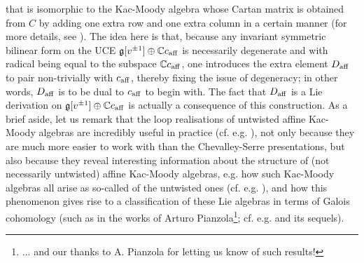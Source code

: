         that is isomorphic to the Kac-Moody algebra whose Cartan matrix is obtained from $C$ by adding one extra row and one extra column in a certain manner (for more details, see \cite[Chapter 7]{kac_infinite_dimensional_lie_algebras}). The idea here is that, because any invariant symmetric bilinear form on the UCE $\mathfrak{g}[v^{\pm 1}] \oplus \mathbb{C} c_{\mathrm{aff}}$ is necessarily degenerate and with radical being equal to the subspace $\mathbb{C} c_{\mathrm{aff}}$, one introduces the extra element $D_{\mathrm{aff}}$ to pair non-trivially with $c_{\mathrm{aff}}$, thereby fixing the issue of degeneracy; in other words, $D_{\mathrm{aff}}$ is to be dual to $c_{\mathrm{aff}}$ to begin with. The fact that $D_{\mathrm{aff}}$ is a Lie derivation on $\mathfrak{g}[v^{\pm 1}] \oplus \mathbb{C} c_{\mathrm{aff}}$ is actually a consequence of this construction. As a brief aside, let us remark that the loop realisations of untwisted affine Kac-Moody algebras are incredibly useful in practice (cf. e.g. \cite[Chapters 9 and 10]{kac_infinite_dimensional_lie_algebras}), not only because they are much more easier to work with than the Chevalley-Serre presentations, but also because they reveal interesting information about the structure of (not necessarily untwisted) affine Kac-Moody algebras, e.g. how such Kac-Moody algebras all arise as so-called  of the untwisted ones (cf. e.g. \cite[Chapter 8]{kac_infinite_dimensional_lie_algebras}), and how this phenomenon gives rise to a classification of these Lie algebras in terms of Galois cohomology (such as in the works of Arturo Pianzola\footnote{... and our thanks to A. Pianzola for letting us know of such results!}; cf. e.g. \cite{pianzola_vanishing_of_H1_of_dedekind_rings} and its sequels). 

